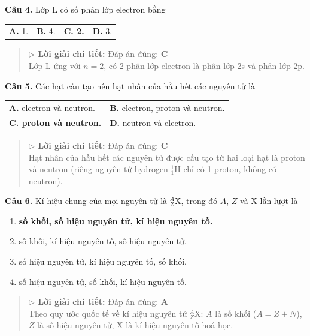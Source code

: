 \documentclass[11pt,a4paper]{article}
\begin{document}
\textbf{Câu 4.} Lớp L có số phân lớp electron bằng
\begin{tabularx}{\textwidth}{@{}XXXX@{}}
\textbf{A.} 1. & \textbf{B.} 4. & \textbf{\color{red} C. 2.} & \textbf{D.} 3. \\
\end{tabularx}
\begin{quote}\small
{\color{myBlue}\textbf{$\triangleright$ Lời giải chi tiết:}} Đáp án đúng: \textbf{\color{red} C}\\
Lớp L ứng với $n = 2$, có 2 phân lớp electron là phân lớp 2s và phân lớp 2p.
\end{quote}
\vspace{2pt}


\textbf{Câu 5.} Các hạt cấu tạo nên hạt nhân của hầu hết các nguyên tử là
\begin{tabularx}{\textwidth}{@{}XX@{}}
\textbf{A.} electron và neutron. & \textbf{B.} electron, proton và neutron. \\
\textbf{\color{red} C. proton và neutron.} & \textbf{D.} neutron và electron. \\
\end{tabularx}
\begin{quote}\small
{\color{myBlue}\textbf{$\triangleright$ Lời giải chi tiết:}} Đáp án đúng: \textbf{\color{red} C}\\
Hạt nhân của hầu hết các nguyên tử được cấu tạo từ hai loại hạt là proton và neutron (riêng nguyên tử hydrogen $^1_1\text{H}$ chỉ có 1 proton, không có neutron).
\end{quote}
\vspace{2pt}


\textbf{Câu 6.} Kí hiệu chung của mọi nguyên tử là $^{A}_{Z}\text{X}$, trong đó $A$, $Z$ và $\text{X}$ lần lượt là
\begin{enumerate}[label=\textbf{\Alph*.},leftmargin=*,itemsep=1pt,topsep=1pt]
\item \textbf{\color{red} số khối, số hiệu nguyên tử, kí hiệu nguyên tố.}
\item số khối, kí hiệu nguyên tố, số hiệu nguyên tử.
\item số hiệu nguyên tử, kí hiệu nguyên tố, số khối.
\item số hiệu nguyên tử, số khối, kí hiệu nguyên tố.
\end{enumerate}
\begin{quote}\small
{\color{myBlue}\textbf{$\triangleright$ Lời giải chi tiết:}} Đáp án đúng: \textbf{\color{red} A}\\
Theo quy ước quốc tế về kí hiệu nguyên tử $^{A}_{Z}\text{X}$: $A$ là số khối ($A = Z + N$), $Z$ là số hiệu nguyên tử, $\text{X}$ là kí hiệu nguyên tố hoá học.
\end{quote}
\vspace{2pt}
\end{document}
